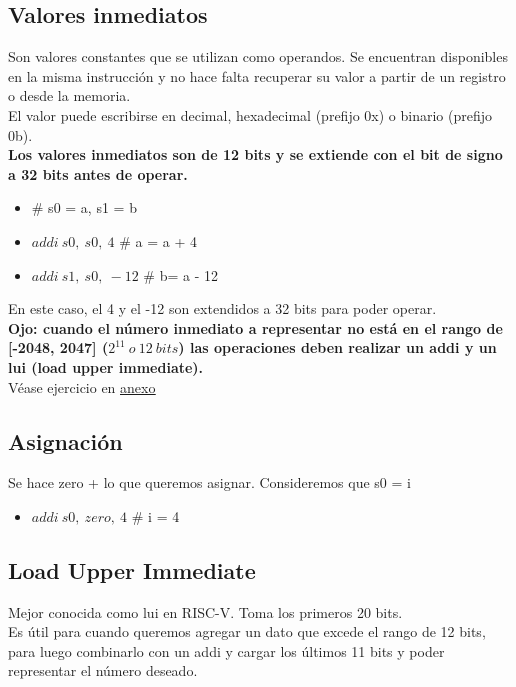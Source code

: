 \documentclass[10pt,a4paper]{article}
\begin{document}
\subsection*{Valores inmediatos}
Son valores constantes que se utilizan como operandos. Se encuentran disponibles en la misma instrucción y no hace falta recuperar su valor a partir de un registro o desde la memoria. \\
El valor puede escribirse en decimal, hexadecimal (prefijo 0x) o binario (prefijo 0b). \\
\textbf{Los valores inmediatos son de 12 bits y se extiende con el bit de signo a 32 bits antes de operar.}
\begin{itemize}
    \item \# s0 = a, s1 = b
    \item \(addi \ s0,\ s0,\ 4\) \# a = a + 4
    \item \(addi \ s1,\ s0, \ -12\) \# b= a - 12
\end{itemize}
En este caso, el 4 y el -12 son extendidos a 32 bits para poder operar. \\ 
\textbf{Ojo: cuando el número inmediato a representar no está en el rango de [-2048, 2047] ($2^{11} \ o \ 12 \ bits$) las operaciones deben realizar un addi y un lui (load upper immediate).} \\
Véase ejercicio en \hyperref[subsec:TPRVC]{\underline{anexo}}

\subsection*{Asignación}
Se hace zero + lo que queremos asignar. Consideremos que s0 = i
\begin{itemize}
    \item \(addi \ s0,\ zero,\ 4\) \# i = 4
\end{itemize}
\subsection*{Load Upper Immediate}
Mejor conocida como lui en RISC-V. Toma los primeros 20 bits. \\ 
Es útil para cuando queremos agregar un dato que excede el rango de 12 bits, para luego combinarlo con un addi y cargar los últimos 11 bits y poder representar el número deseado.
\end{document}
